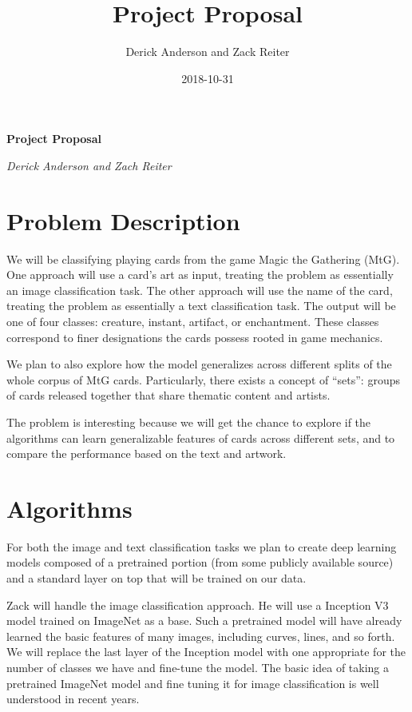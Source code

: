 \documentclass{article}
\title{Project Proposal}
\date{2018-10-31}
\author{Derick Anderson and Zack Reiter}
\begin{document}

\begin{center}
  \textbf{Project Proposal}
  
  \textit{Derick Anderson and Zach Reiter}
\end{center}

\section*{Problem Description}

We will be classifying playing cards from the game Magic the Gathering (MtG).
One approach will use a card's art as input,
treating the problem
as essentially an image classification task.
The other approach will use the name of the card,
treating the problem
as essentially a text classification task.
The output will be one of four classes:
creature, instant, artifact, or enchantment.
These classes correspond to
finer designations the cards possess
rooted in game mechanics.

We plan to also explore
how the model generalizes across different splits
of the whole corpus of MtG cards.
Particularly,
there exists a concept of ``sets'':
groups of cards released together that share thematic content and artists.

The problem is interesting because we will get the chance to
explore if the algorithms can learn generalizable features
of cards across different sets,
and to compare the performance based on the text and artwork.

\section*{Algorithms}

For both the image and text classification tasks
we plan to create deep learning models
composed of a pretrained portion
(from some publicly available source)
and a standard layer on top that will be trained on our data.

Zack will handle the image classification approach.
He will use a Inception V3
\cite{rethinking-the-inception-architecture}
model trained on ImageNet as a base.
Such a pretrained model
will have already learned the basic features of many images,
including curves, lines, and so forth.
We will replace the last layer of the Inception model
with one appropriate for the number of classes we have
and fine-tune the model.
The basic idea of taking a pretrained ImageNet model
and fine tuning it for image classification is well understood
in recent years.
\end{document}
